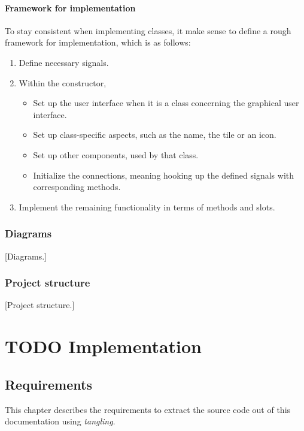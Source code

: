 \documentclass[10pt, openright, notitlepage]{scrreprt}
\begin{document}
\subsubsection{Framework for implementation}
\label{sec:framework-for-implementation}
To stay consistent when implementing classes, it make sense to define a rough
framework for implementation, which is as follows:

\begin{enumerate}
\item Define necessary signals.
\item Within the constructor,
\begin{itemize}
\item Set up the user interface when it is a class concerning the graphical user
interface.
\item Set up class-specific aspects, such as the name, the tile or an icon.
\item Set up other components, used by that class.
\item Initialize the connections, meaning hooking up the defined signals with
corresponding methods.
\end{itemize}
\item Implement the remaining functionality in terms of methods and slots.
\end{enumerate}

\subsection{Diagrams}
\label{sec:org9d47539}

[Diagrams.]

\subsection{Project structure}
\label{sec:orgd3c7d47}

[Project structure.]

\chapter{{\bfseries\sffamily TODO} Implementation}
\label{sec:orge7ce64b}

\section{Requirements}
\label{sec:orge815e61}

This chapter describes the requirements to extract the source code out of this
documentation using \emph{tangling}.
\end{document}
